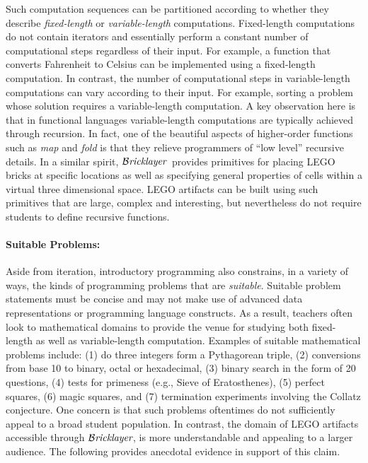 \documentclass[submission,copyright,creativecommons]{eptcs}
\newcommand{\bricklayer}{\ensuremath{\mathcal{B}\emph{ricklayer}}}
\begin{document}
Such computation sequences can be partitioned according to whether they describe \emph{fixed-length} or \emph{variable-length} computations. Fixed-length computations do not contain iterators and essentially perform a constant number of computational steps regardless of their input. For example, a function that converts Fahrenheit to Celsius can be implemented using a fixed-length computation. In contrast, the number of computational steps in variable-length computations can vary according to their input. For example, sorting a problem whose solution requires a variable-length computation. A key observation here is that in functional languages variable-length computations are typically achieved through recursion. In fact, one of the beautiful aspects of higher-order functions such as \emph{map} and \emph{fold} is that they relieve programmers of ``low level'' recursive details. In a similar spirit, \bricklayer\ provides primitives for placing LEGO bricks at specific locations as well as specifying general properties of cells within a virtual three dimensional space. LEGO artifacts can be built using such primitives that are large, complex and interesting, but nevertheless do not require students to define recursive functions.



\paragraph{Suitable Problems:} Aside from iteration, introductory programming also constrains, in a variety of ways, the kinds of programming problems that are \emph{suitable}. Suitable problem statements must be concise and may not make use of advanced data representations or programming language constructs. As a result, teachers often look to mathematical domains to provide the venue for studying both fixed-length as well as variable-length computation. Examples of suitable mathematical problems include: (1) do three integers form a Pythagorean triple, (2) conversions from base 10 to binary, octal or hexadecimal, (3) binary search in the form of 20 questions, (4) tests for primeness (e.g., Sieve of Eratosthenes), (5) perfect squares, (6) magic squares, and (7) termination experiments involving the Collatz conjecture. One concern is that such problems oftentimes do not sufficiently appeal to a broad student population. In contrast, the domain of LEGO artifacts accessible through \bricklayer, is more understandable and appealing to a larger audience. The following provides anecdotal evidence in support of this claim.
\end{document}
